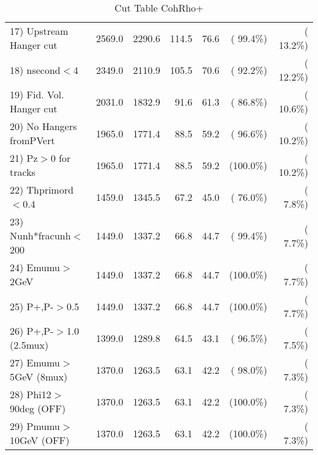\begin{table}[h!]
\begin{tabular}{||l||r|r|r|r|r|r||}
 17) Upstream Hanger cut  &       2569.0 &       2290.6 &        114.5 &         76.6 & ( 99.4\%) & ( 13.2\%) \\
 18) nsecond$<$4          &       2349.0 &       2110.9 &        105.5 &         70.6 & ( 92.2\%) & ( 12.2\%) \\
 19) Fid. Vol. Hanger cut &       2031.0 &       1832.9 &         91.6 &         61.3 & ( 86.8\%) & ( 10.6\%) \\
 20) No Hangers fromPVert &       1965.0 &       1771.4 &         88.5 &         59.2 & ( 96.6\%) & ( 10.2\%) \\
 21) Pz$>$0 for tracks    &       1965.0 &       1771.4 &         88.5 &         59.2 & (100.0\%) & ( 10.2\%) \\
 22) Thprimord$<$0.4      &       1459.0 &       1345.5 &         67.2 &         45.0 & ( 76.0\%) & (  7.8\%) \\
 23) Nunh*fracunh$<$200   &       1449.0 &       1337.2 &         66.8 &         44.7 & ( 99.4\%) & (  7.7\%) \\
 24) Emumu$>$2GeV         &       1449.0 &       1337.2 &         66.8 &         44.7 & (100.0\%) & (  7.7\%) \\
 25) P+,P-$>$0.5          &       1449.0 &       1337.2 &         66.8 &         44.7 & (100.0\%) & (  7.7\%) \\
 26) P+,P-$>$1.0 (2.5mux) &       1399.0 &       1289.8 &         64.5 &         43.1 & ( 96.5\%) & (  7.5\%) \\
 27) Emumu$>$5GeV  (8mux) &       1370.0 &       1263.5 &         63.1 &         42.2 & ( 98.0\%) & (  7.3\%) \\
 28) Phi12$>$90deg  (OFF) &       1370.0 &       1263.5 &         63.1 &         42.2 & (100.0\%) & (  7.3\%) \\
 29) Pmumu$>$10GeV  (OFF) &       1370.0 &       1263.5 &         63.1 &         42.2 & (100.0\%) & (  7.3\%) \\
 \hline
 \hline
 \end{tabular}
 \caption{Cut Table  CohRho+  }
 \label{tab-cutcohjpsi-mumu_cohrhop}
 \end{table}
